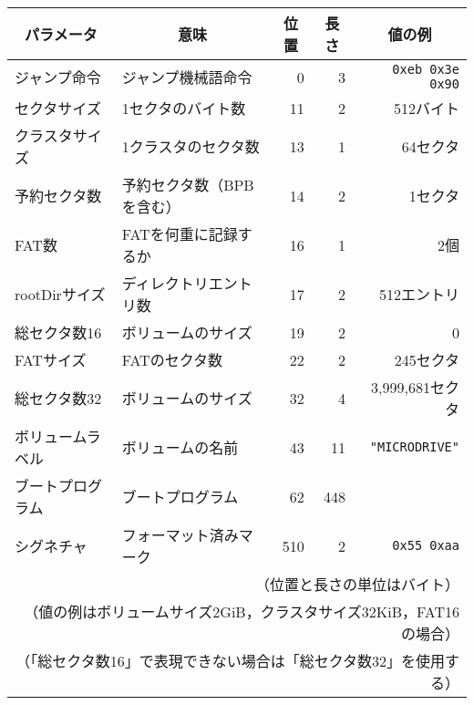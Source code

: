 \documentclass{standalone}
\begin{document}
\begin{tabular}{l | l | r | r | r}\hline\hline
  \multicolumn{1}{c|}{パラメータ} &
  \multicolumn{1}{c|}{意味} &
  \multicolumn{1}{c|}{位置} &
  \multicolumn{1}{c|}{長さ} &
  \multicolumn{1}{c}{値の例}\\\hline
  ジャンプ命令     & ジャンプ機械語命令 & 0 & 3 & \texttt{0xeb 0x3e 0x90} \\
  セクタサイズ     & 1セクタのバイト数 & 11 & 2 & 512バイト \\
  クラスタサイズ   & 1クラスタのセクタ数& 13 & 1 & 64セクタ \\
  予約セクタ数     & 予約セクタ数（BPBを含む）& 14 & 2 & 1セクタ \\
  FAT数            & FATを何重に記録するか& 16 & 1 & 2個 \\
  rootDirサイズ    & ディレクトリエントリ数 &  17 & 2 & 512エントリ \\
  総セクタ数16     & ボリュームのサイズ & 19 & 2 & 0 \\
  FATサイズ        & FATのセクタ数    & 22 & 2  & 245セクタ \\
  総セクタ数32     & ボリュームのサイズ & 32 & 4 & 3,999,681セクタ \\
  ボリュームラベル & ボリュームの名前 & 43 & 11 
                   & \texttt{"MICRODRIVE\textvisiblespace"} \\
  ブートプログラム & ブートプログラム & 62 & 448 & \\
  シグネチャ       & フォーマット済みマーク & 510 & 2 & \texttt{0x55 0xaa} \\
  \multicolumn{5}{r}{
    （位置と長さの単位はバイト）}\\
  \multicolumn{5}{r}{
    （値の例はボリュームサイズ2GiB，クラスタサイズ32KiB，FAT16の場合）}\\
  \multicolumn{5}{r}{
    （「総セクタ数16」で表現できない場合は「総セクタ数32」を使用する）}
\end{tabular}
\end{document}
